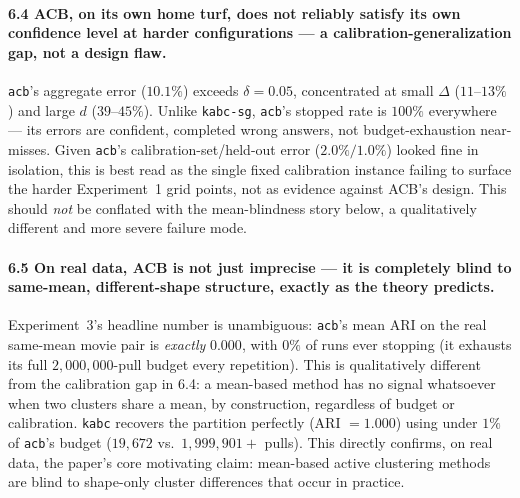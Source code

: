 \documentclass[11pt]{article}
\begin{document}
\paragraph{6.4 ACB, on its own home turf, does not reliably satisfy its own
confidence level at harder configurations --- a calibration-generalization
gap, not a design flaw.}
\texttt{acb}'s aggregate error ($10.1\%$) exceeds $\delta=0.05$, concentrated at
small $\Delta$ ($11$--$13\%$) and large $d$ ($39$--$45\%$). Unlike \texttt{kabc-sg},
\texttt{acb}'s stopped rate is $100\%$ everywhere --- its errors are confident,
completed wrong answers, not budget-exhaustion near-misses. Given \texttt{acb}'s
calibration-set/held-out error ($2.0\%/1.0\%$) looked fine in isolation, this is
best read as the single fixed calibration instance failing to surface the
harder Experiment~1 grid points, not as evidence against ACB's design. This
should \emph{not} be conflated with the mean-blindness story below, a
qualitatively different and more severe failure mode.

\paragraph{6.5 On real data, ACB is not just imprecise --- it is completely blind
to same-mean, different-shape structure, exactly as the theory predicts.}
Experiment~3's headline number is unambiguous: \texttt{acb}'s mean ARI on the
real same-mean movie pair is \emph{exactly} $0.000$, with $0\%$ of runs ever
stopping (it exhausts its full $2{,}000{,}000$-pull budget every repetition).
This is qualitatively different from the calibration gap in 6.4: a mean-based
method has no signal whatsoever when two clusters share a mean, by
construction, regardless of budget or calibration. \texttt{kabc} recovers the
partition perfectly (ARI $=1.000$) using under $1\%$ of \texttt{acb}'s budget
($19{,}672$ vs.\ $1{,}999{,}901{+}$ pulls). This directly confirms, on real data,
the paper's core motivating claim: mean-based active clustering methods are
blind to shape-only cluster differences that occur in practice.
\end{document}
